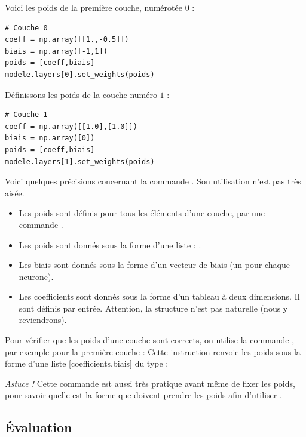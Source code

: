 \documentclass[11pt,class=report,crop=false]{standalone}
\begin{document}
\bigskip

\begin{minipage}{0.55\textwidth}
Voici les poids de la première couche, numérotée $0$ :
\begin{lstlisting}
# Couche 0
coeff = np.array([[1.,-0.5]])
biais = np.array([-1,1])
poids = [coeff,biais]
modele.layers[0].set_weights(poids)
\end{lstlisting}
Définissons les poids de la couche numéro $1$ :
\begin{lstlisting}
# Couche 1
coeff = np.array([[1.0],[1.0]])
biais = np.array([0])
poids = [coeff,biais]
modele.layers[1].set_weights(poids)
\end{lstlisting} 
\end{minipage}
\begin{minipage}{0.40\textwidth}
\end{minipage}


Voici quelques précisions concernant la commande . Son utilisation n'est pas très aisée. 
\begin{itemize}
  \item Les poids sont définis pour tous les éléments d'une couche, par une commande .
  \item Les poids sont donnés sous la forme d'une liste : .
  \item Les biais sont donnés sous la forme d'un vecteur de biais (un pour chaque neurone).
  \item Les coefficients sont donnés sous la forme d'un tableau à deux dimensions. Il sont définis par entrée. Attention, la structure n'est pas naturelle (nous y reviendrons).
\end{itemize}

Pour vérifier que les poids d'une couche sont corrects, on utilise la commande , par exemple pour la première couche :
Cette instruction renvoie les poids sous la forme d'une liste [coefficients,biais] du type :
\mycenterline{\ci{[  [[ 1.  -0.5]],  [-1.  1.]  ]}}

\emph{Astuce !} Cette commande est aussi très pratique avant même de fixer les poids, pour savoir quelle est la forme que doivent prendre les poids afin d'utiliser .


\subsection{Évaluation}
\end{document}
